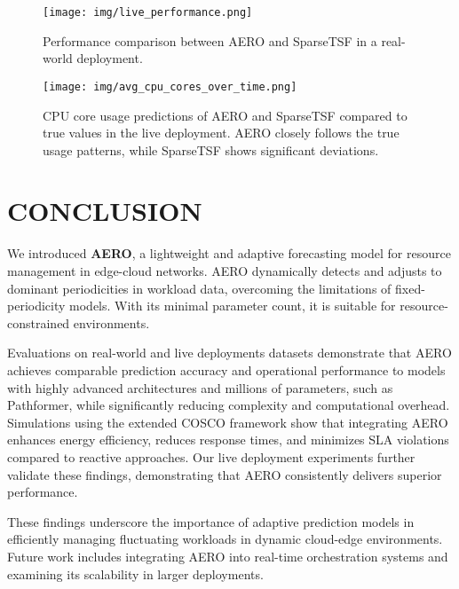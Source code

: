 \documentclass{ieeetmlcn}
\begin{document}
\begin{figure}\centering
\centering
    \centering\texttt{[image: img/live\_performance.png]}
    \caption{Performance comparison between AERO and SparseTSF in a real-world deployment.}
    \label{fig:live_performance}
\end{figure}

\begin{figure}\centering
[t]
    \centering
    \centering\texttt{[image: img/avg\_cpu\_cores\_over\_time.png]}
    \caption{CPU core usage predictions of AERO and SparseTSF compared to true values in the live deployment. AERO closely follows the true usage patterns, while SparseTSF shows significant deviations.}
    \label{fig:cpu_predictions}
\end{figure}

\section{CONCLUSION}
\label{sec:conclusion}

We introduced \textbf{AERO}, a lightweight and adaptive forecasting model for resource management in edge-cloud networks. AERO dynamically detects and adjusts to dominant periodicities in workload data, overcoming the limitations of fixed-periodicity models. With its minimal parameter count, it is suitable for resource-constrained environments.

Evaluations on real-world and live deployments datasets demonstrate that AERO achieves comparable prediction accuracy and operational performance to models with highly advanced architectures and millions of parameters, such as Pathformer, while significantly reducing complexity and computational overhead. Simulations using the extended COSCO framework show that integrating AERO enhances energy efficiency, reduces response times, and minimizes SLA violations compared to reactive approaches. {\color{blue} Our live deployment experiments further validate these findings, demonstrating that AERO consistently delivers superior performance}.

These findings underscore the importance of adaptive prediction models in efficiently managing fluctuating workloads in dynamic cloud-edge environments. Future work includes integrating AERO into real-time orchestration systems and examining its scalability in larger deployments.

\end{document}
